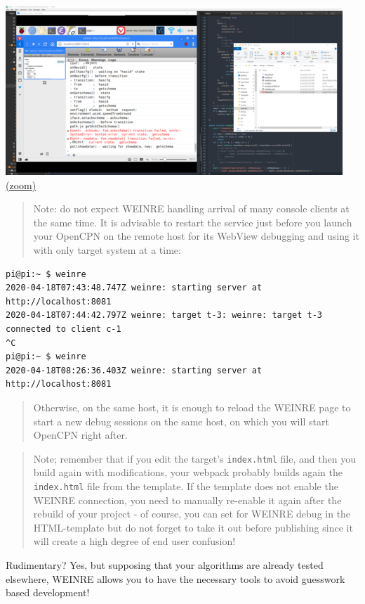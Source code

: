 \documentclass[11pt]{article}
\begin{document}
    \includegraphics{2020-04-18_weinre_dbg_async_events_and_fsm.png}
\href{img/2020-04-18_weinre_dbg_async_events_and_fsm.png}{(zoom)}

    \begin{quote}
Note: do not expect WEINRE handling arrival of many console clients at
the same time. It is advisable to restart the service just before you
launch your OpenCPN on the remote host for its WebView debugging and
using it with only target system at a time:
\end{quote}

\begin{verbatim}
pi@pi:~ $ weinre
2020-04-18T07:43:48.747Z weinre: starting server at http://localhost:8081
2020-04-18T07:44:42.797Z weinre: target t-3: weinre: target t-3 connected to client c-1
^C
pi@pi:~ $ weinre
2020-04-18T08:26:36.403Z weinre: starting server at http://localhost:8081
\end{verbatim}

\begin{quote}
Otherwise, on the same host, it is enough to reload the WEINRE page to
start a new debug sessions on the same host, on which you will start
OpenCPN right after.
\end{quote}

    \begin{quote}
Note; remember that if you edit the target's \texttt{index.html} file,
and then you build again with modifications, your webpack probably
builds again the \texttt{index.html} file from the template. If the
template does not enable the WEINRE connection, you need to manually
re-enable it again after the rebuild of your project - of course, you
can set for WEINRE debug in the HTML-template but do not forget to take
it out before publishing since it will create a high degree of end user
confusion!
\end{quote}

    Rudimentary? Yes, but supposing that your algorithms are already tested
elsewhere, WEINRE allows you to have the necessary tools to avoid
guesswork based development!
\end{document}
